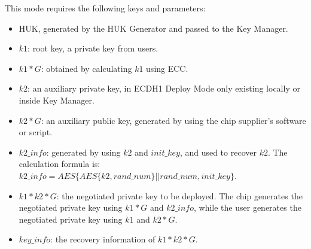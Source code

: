 \documentclass[main\_\_EN.tex]{subfiles}
\begin{document}
This mode requires the following keys and parameters:
\begin{itemize}
    \item HUK, generated by the HUK Generator and passed to the Key Manager.
    \item \begin{math}k1\end{math}: root key, a private key from users.
    \item \begin{math}k1*G\end{math}: obtained by calculating \begin{math}k1\end{math} using ECC.
    \item \begin{math}k2\end{math}: an auxiliary private key, in ECDH1 Deploy Mode only existing locally or inside Key Manager.
    \item \begin{math}k2*G\end{math}: an auxiliary public key, generated by using the chip supplier's software or script.
    \item \begin{math}k2\_info\end{math}: generated by using \begin{math}k2\end{math} and \begin{math}init\_key\end{math}, and used to recover \begin{math}k2\end{math}. The calculation formula is: \begin{math}k2\_info = AES\{AES\{k2,rand\_num\}||rand\_num,init\_key\}\end{math}.
    \item \begin{math}k1*k2*G\end{math}: the negotiated private key to be deployed. The chip generates the negotiated private key using \begin{math}k1*G\end{math} and \begin{math}k2\_info\end{math}, while the user generates the negotiated private key using \begin{math}k1\end{math} and \begin{math}k2*G\end{math}.
    \item \hyperref[para:keyinfo]{\begin{math}key\_info\end{math}}: the recovery information of \begin{math}k1*k2*G\end{math}.
\end{itemize}
\end{document}
